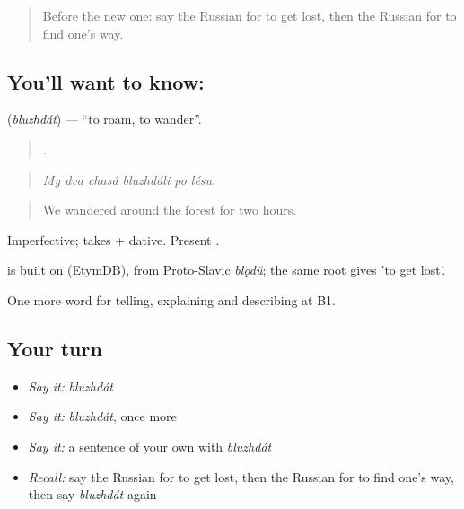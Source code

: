 \label{lesson:RU-C437-bluzhdat}



\begin{quote}
Before the new one: say the Russian for to get lost, then the Russian for to find one's way.
\end{quote}

\subsection*{You'll want to know: }
\textbf{} (\emph{bluzhdát}) — \textquotedblleft{}to roam, to wander\textquotedblright{}.

\begin{quote}
     .
\end{quote}

\begin{quote}
\emph{My dva chasá bluzhdáli po lésu.}
\end{quote}

\begin{quote}
We wandered around the forest for two hours.
\end{quote}

Imperfective; takes \emph{} + dative. Present \emph{}.

\begin{cousinweb}
\emph{} is built on \emph{} (EtymDB), from Proto-Slavic \emph{blǫdŭ}; the same root gives \emph{} 'to get lost'.
\end{cousinweb}

\begin{grammarlens}[title={What you've built}]
One more word for telling, explaining and describing at B1.
\end{grammarlens}

\subsection*{Your turn}
\begin{itemize}
\raggedright
  \item \emph{Say it:} \emph{bluzhdát}
  \item \emph{Say it:} \emph{bluzhdát}, once more
  \item \emph{Say it:} a sentence of your own with \emph{bluzhdát}
  \item \emph{Recall:} say the Russian for to get lost, then the Russian for to find one's way, then say \emph{bluzhdát} again
\end{itemize}

